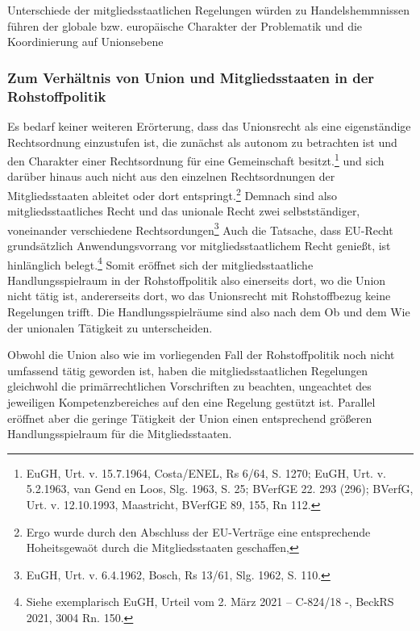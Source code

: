 \documentclass[12pt,a4paper,oneside]{book} %
\begin{document}
	Unterschiede der mitgliedsstaatlichen Regelungen würden zu Handelshemmnissen führen
	der globale bzw. europäische Charakter der Problematik und die Koordinierung auf Unionsebene
	
	\subsubsection{Zum Verhältnis von Union und Mitgliedsstaaten in der Rohstoffpolitik}
	
	Es bedarf keiner weiteren Erörterung, dass das Unionsrecht als eine eigenständige Rechtsordnung einzustufen ist, die zunächst als autonom zu betrachten ist und den Charakter einer Rechtsordnung für eine Gemeinschaft besitzt.\footnote{EuGH, Urt. v. 15.7.1964, Costa/ENEL, Rs 6/64, S. 1270; EuGH, Urt. v. 5.2.1963, van Gend en Loos, Slg. 1963, S. 25; BVerfGE 22. 293 (296); BVerfG, Urt. v. 12.10.1993, Maastricht, BVerfGE 89, 155, Rn 112.} und sich darüber hinaus auch nicht aus den einzelnen Rechtsordnungen der Mitgliedsstaaten ableitet oder dort entspringt.\footnote{Ergo wurde durch den Abschluss der EU-Verträge eine entsprechende Hoheitsgewaöt durch die Mitgliedsstaaten geschaffen,} Demnach sind also mitgliedsstaatliches Recht und das unionale Recht \glqq zwei selbstständiger, voneinander verschiedene Rechtsordungen\grqq\footnote{EuGH, Urt. v. 6.4.1962, Bosch, Rs 13/61, Slg. 1962, S. 110.} Auch die Tatsache, dass EU-Recht grundsätzlich Anwendungsvorrang vor mitgliedsstaatlichem Recht genießt, ist hinlänglich belegt.\footnote{Siehe exemplarisch EuGH, Urteil vom 2. März 2021 – C-824/18 -, BeckRS 2021, 3004 Rn. 150.} Somit eröffnet sich der mitgliedsstaatliche Handlungsspielraum in der Rohstoffpolitik also einerseits dort, wo die Union nicht tätig ist, andererseits dort, wo das Unionsrecht mit Rohstoffbezug keine Regelungen trifft. Die Handlungsspielräume sind also nach dem Ob und dem Wie der unionalen Tätigkeit zu unterscheiden.
	
	
	
	Obwohl die Union also wie im vorliegenden Fall der Rohstoffpolitik noch nicht umfassend tätig geworden ist, haben die mitgliedsstaatlichen Regelungen gleichwohl die primärrechtlichen Vorschriften zu beachten, ungeachtet des jeweiligen Kompetenzbereiches auf den eine Regelung gestützt ist. Parallel eröffnet aber die geringe Tätigkeit der Union einen entsprechend größeren Handlungsspielraum für die Mitgliedsstaaten.
	
\end{document}
